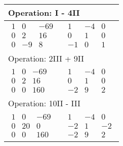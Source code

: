 \begin{longtable}{p{4cm}|p{3cm}}
    \multicolumn{2}{p{\dimexpr4cm+3cm+2\tabcolsep\relax}}{Operation: I - 4II}              \\\hline\pagebreak[0]
    $\displaystyle\begin{matrix}
                          1 & 0  & -69 \\
                          0 & 2  & 16  \\
                          0 & -9 & 8
                      \end{matrix}$         &
    $\displaystyle\begin{matrix}
                          1  & -4 & 0 \\
                          0  & 1  & 0 \\
                          -1 & 0  & 1
                      \end{matrix}$                                                            \\\hline

    \multicolumn{2}{p{\dimexpr4cm+3cm+2\tabcolsep\relax}}{Operation: 2III + 9II}           \\\hline\pagebreak[0]
    $\displaystyle\begin{matrix}
                          1 & 0 & -69 \\
                          0 & 2 & 16  \\
                          0 & 0 & 160
                      \end{matrix}$         &
    $\displaystyle\begin{matrix}
                          1  & -4 & 0 \\
                          0  & 1  & 0 \\
                          -2 & 9  & 2
                      \end{matrix}$                                                            \\\hline

    \multicolumn{2}{p{\dimexpr4cm+3cm+2\tabcolsep\relax}}{Operation: 10II - III}           \\\hline\pagebreak[0]
    $\displaystyle\begin{matrix}
                          1 & 0  & -69 \\
                          0 & 20 & 0   \\
                          0 & 0  & 160
                      \end{matrix}$         &
    $\displaystyle\begin{matrix}
                          1  & -4 & 0  \\
                          -2 & 1  & -2 \\
                          -2 & 9  & 2
                      \end{matrix}$                                                            \\\hline


\end{longtable}
